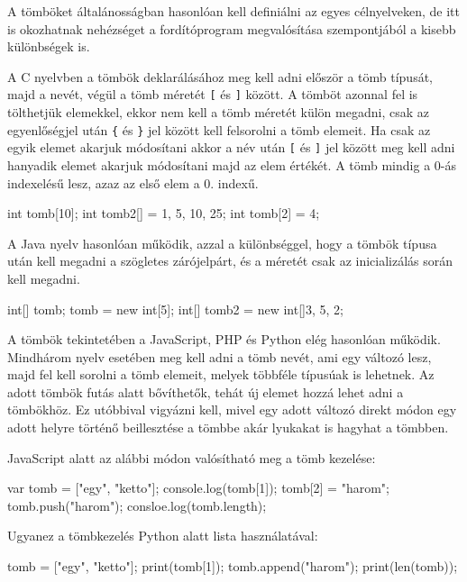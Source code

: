 
A tömböket általánosságban hasonlóan kell definiálni az egyes célnyelveken, de itt is okozhatnak nehézséget a fordítóprogram megvalósítása szempontjából a kisebb különbségek is.

A C nyelvben a tömbök deklarálásához meg kell adni először a tömb típusát, majd a nevét, végül a tömb méretét \texttt{[} és \texttt{]} között. A tömböt azonnal fel is tölthetjük elemekkel, ekkor nem kell a tömb méretét külön megadni, csak az egyenlőségjel után \texttt{\{} és \texttt{\}} jel között kell felsorolni a tömb elemeit.
Ha csak az egyik elemet akarjuk módosítani akkor a név után \texttt{[} és \texttt{]} jel között meg kell adni hanyadik elemet akarjuk módosítani majd az elem értékét. A tömb mindig a 0-ás indexelésű lesz, azaz az első elem a 0. indexű.
\begin{cpp}
	int tomb[10];
	int tomb2[] = {1, 5, 10, 25};
	int tomb[2] = 4;
\end{cpp}

A Java nyelv hasonlóan működik, azzal a különbséggel, hogy a tömbök típusa után kell megadni a szögletes zárójelpárt, és a méretét csak az inicializálás során kell megadni.
\begin{cpp}
	int[] tomb;
	tomb = new int[5];
	int[] tomb2 = new int[]{3, 5, 2};
\end{cpp}
A tömbök tekintetében a JavaScript, PHP és Python elég hasonlóan működik. Mindhárom nyelv esetében meg kell adni a tömb nevét, ami egy változó lesz, majd fel kell sorolni a tömb elemeit, melyek többféle típusúak is lehetnek. Az adott tömbök futás alatt bővíthetők, tehát új elemet hozzá lehet adni a tömbökhöz. Ez utóbbival vigyázni kell, mivel egy adott változó direkt módon egy adott helyre történő beillesztése a tömbbe akár lyukakat is hagyhat a tömbben.

JavaScript alatt az alábbi módon valósítható meg a tömb kezelése:
\begin{cpp}
	var tomb = ["egy", "ketto"];
	console.log(tomb[1]);
	tomb[2] = "harom";
	tomb.push("harom");
	consloe.log(tomb.length);
\end{cpp}


Ugyanez a tömbkezelés Python alatt lista használatával:
\begin{cpp}
	tomb = ["egy", "ketto"];
	print(tomb[1]);
	tomb.append("harom");
	print(len(tomb));
\end{cpp}


